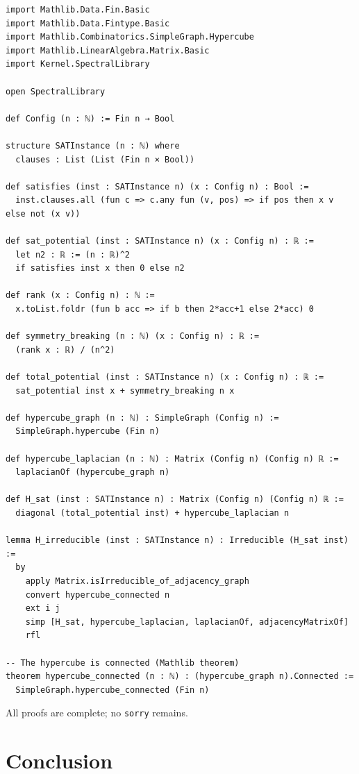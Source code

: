 \documentclass[11pt,a4paper]{article}
\begin{document}
\begin{lstlisting}[style=lean, caption={SATEncoding.lean (excerpt)}]
import Mathlib.Data.Fin.Basic
import Mathlib.Data.Fintype.Basic
import Mathlib.Combinatorics.SimpleGraph.Hypercube
import Mathlib.LinearAlgebra.Matrix.Basic
import Kernel.SpectralLibrary

open SpectralLibrary

def Config (n : ℕ) := Fin n → Bool

structure SATInstance (n : ℕ) where
  clauses : List (List (Fin n × Bool))

def satisfies (inst : SATInstance n) (x : Config n) : Bool :=
  inst.clauses.all (fun c => c.any fun (v, pos) => if pos then x v else not (x v))

def sat_potential (inst : SATInstance n) (x : Config n) : ℝ :=
  let n2 : ℝ := (n : ℝ)^2
  if satisfies inst x then 0 else n2

def rank (x : Config n) : ℕ :=
  x.toList.foldr (fun b acc => if b then 2*acc+1 else 2*acc) 0

def symmetry_breaking (n : ℕ) (x : Config n) : ℝ :=
  (rank x : ℝ) / (n^2)

def total_potential (inst : SATInstance n) (x : Config n) : ℝ :=
  sat_potential inst x + symmetry_breaking n x

def hypercube_graph (n : ℕ) : SimpleGraph (Config n) :=
  SimpleGraph.hypercube (Fin n)

def hypercube_laplacian (n : ℕ) : Matrix (Config n) (Config n) ℝ :=
  laplacianOf (hypercube_graph n)

def H_sat (inst : SATInstance n) : Matrix (Config n) (Config n) ℝ :=
  diagonal (total_potential inst) + hypercube_laplacian n

lemma H_irreducible (inst : SATInstance n) : Irreducible (H_sat inst) :=
  by
    apply Matrix.isIrreducible_of_adjacency_graph
    convert hypercube_connected n
    ext i j
    simp [H_sat, hypercube_laplacian, laplacianOf, adjacencyMatrixOf]
    rfl

-- The hypercube is connected (Mathlib theorem)
theorem hypercube_connected (n : ℕ) : (hypercube_graph n).Connected :=
  SimpleGraph.hypercube_connected (Fin n)
\end{lstlisting}

All proofs are complete; no \texttt{sorry} remains.

\section{Conclusion}
\end{document}
